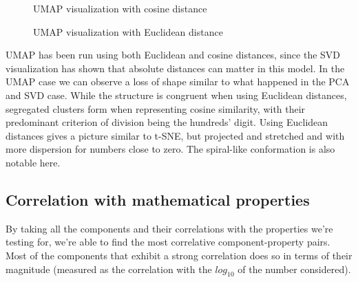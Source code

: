 \documentclass[
  a4paper, twoside, 10pt, titlepage]{book}
\makeatletter
\newcommand*\pandocbounded[1]{%
  \sbox\pandoc@box{#1}%
  \Gscale@div\@tempa{\textheight}{\dimexpr\ht\pandoc@box+\dp\pandoc@box\relax}%
  \Gscale@div\@tempb{\linewidth}{\wd\pandoc@box}%
  \ifdim\@tempb\p@<\@tempa\p@\let\@tempa\@tempb\fi%
  \ifdim\@tempa\p@<\p@\scalebox{\@tempa}{\usebox\pandoc@box}%
  \else\usebox{\pandoc@box}%
  \fi%
}
\makeatother
\begin{document}
\begin{figure}
\centering
\pandocbounded{}
\caption{UMAP visualization with cosine
distance}\label{fig-olmo-umap-cosine}
\end{figure}

\begin{figure}
\centering
\pandocbounded{}
\caption{UMAP visualization with Euclidean
distance}\label{fig-olmo-umap-euclidean}
\end{figure}

UMAP has been run using both Euclidean and cosine distances, since the
SVD visualization has shown that absolute distances can matter in this
model. In the UMAP case we can observe a loss of shape similar to what
happened in the PCA and SVD case. While the structure is congruent when
using Euclidean distances, segregated clusters form when representing
cosine similarity, with their predominant criterion of division being
the hundreds' digit. Using Euclidean distances gives a picture similar
to t-SNE, but projected and stretched and with more dispersion for
numbers close to zero. The spiral-like conformation is also notable
here.

\subsection{Correlation with mathematical
properties}\label{correlation-with-mathematical-properties}

By taking all the components and their correlations with the properties
we're testing for, we're able to find the most correlative
component-property pairs. Most of the components that exhibit a strong
correlation does so in terms of their magnitude (measured as the
correlation with the \(log_{10}\) of the number considered).
\end{document}

